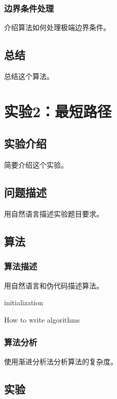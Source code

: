 \documentclass{ctexrep}
\begin{document}
\subsection{边界条件处理}
介绍算法如何处理极端边界条件。

\section{总结}
总结这个算法。

\chapter{实验2：最短路径}
\section{实验介绍}
简要介绍这个实验。

\section{问题描述}
用自然语言描述实验题目要求。

\section{算法}
\subsection{算法描述}
用自然语言和伪代码描述算法。
\begin{algorithm}
\SetAlgoLined
{}
 initialization\;
 \caption{How to write algorithms}
\end{algorithm}

\subsection{算法分析}
使用渐进分析法分析算法的复杂度。

\section{实验}
\end{document}
